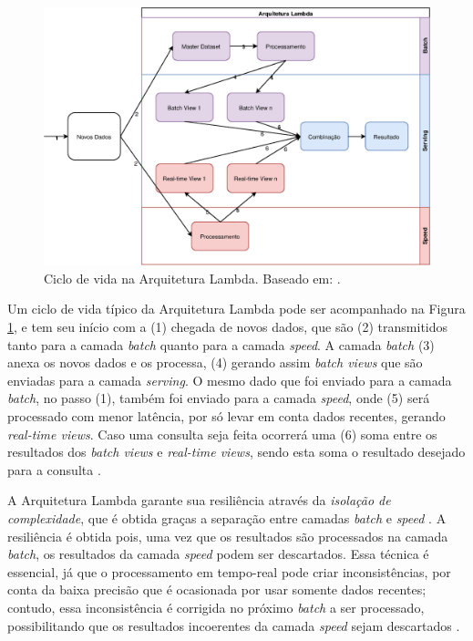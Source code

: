 \begin{figure}
  \centering
    \includegraphics[width=\textwidth]{figuras/lambda-lifecycle.eps}
    \caption{Ciclo de vida na Arquitetura Lambda. Baseado em: .}
  \label{fig:lambda-lifecycle}
\end{figure}

Um ciclo de vida típico da Arquitetura Lambda pode ser acompanhado na Figura
\ref{fig:lambda-lifecycle}, e tem seu início com a (1) chegada
de novos dados, que são (2) transmitidos tanto para a camada
\textit{batch} quanto para a camada \textit{speed}. A camada \textit{batch}
(3) anexa os novos dados e os processa, (4) gerando assim
\textit{batch views} que são enviadas para a camada \textit{serving}. O mesmo
dado que foi enviado para a camada \textit{batch}, no passo (1), também foi
enviado para a camada \textit{speed}, onde (5) será processado com menor latência,
por só levar em conta dados recentes, gerando \textit{real-time views}. 
Caso uma consulta seja feita ocorrerá uma (6) soma entre os resultados
dos \textit{batch views} e \textit{real-time views}, sendo esta soma o resultado
desejado para a consulta \cite{marz2015}.

A Arquitetura Lambda garante sua resiliência através da \textit{isolação de
complexidade}, que é obtida graças a separação entre camadas \textit{batch}
e \textit{speed} \cite{marz2015}. A resiliência é obtida pois, uma vez que os
resultados são processados na camada \textit{batch}, os resultados da camada
\textit{speed} podem ser descartados. Essa técnica é essencial, já que o
processamento em tempo-real pode criar inconsistências, por conta da baixa
precisão que é ocasionada por usar somente dados recentes; contudo, essa
inconsistência é corrigida no próximo \textit{batch} a ser processado,
possibilitando que os resultados incoerentes da camada \textit{speed} sejam
descartados \cite{marz2015}.

